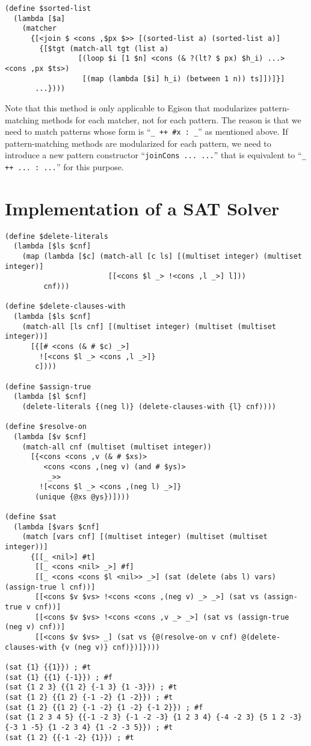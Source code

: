\documentclass{article}
\begin{document}
\begin{lstlisting}[language=egison]
(define $sorted-list
  (lambda [$a]
    (matcher
      {[<join $ <cons ,$px $>> [(sorted-list a) (sorted-list a)]
        {[$tgt (match-all tgt (list a)
                 [(loop $i [1 $n] <cons (& ?(lt? $ px) $h_i) ...> <cons ,px $ts>)
                  [(map (lambda [$i] h_i) (between 1 n)) ts]])]}]
       ...})))
\end{lstlisting}

Note that this method is only applicable to Egison that modularizes pattern-matching methods for each matcher, not for each pattern.
The reason is that we need to match patterns whose form is ``\verb|_ ++ #x : _|'' as mentioned above.
If pattern-matching methods are modularized for each pattern, we need to introduce a new pattern constructor ``\verb|joinCons ... ...|'' that is equivalent to ``\verb|_ ++ ... : ...|'' for this purpose.

\section{Implementation of a SAT Solver}\label{sat-program}

\begin{lstlisting}[language=egison]
(define $delete-literals
  (lambda [$ls $cnf]
    (map (lambda [$c] (match-all [c ls] [(multiset integer) (multiset integer)]
                        [[<cons $l _> !<cons ,l _>] l]))
         cnf)))

(define $delete-clauses-with
  (lambda [$ls $cnf]
    (match-all [ls cnf] [(multiset integer) (multiset (multiset integer))]
      [{[# <cons (& # $c) _>]
        ![<cons $l _> <cons ,l _>]}
       c])))

(define $assign-true
  (lambda [$l $cnf]
    (delete-literals {(neg l)} (delete-clauses-with {l} cnf))))

(define $resolve-on
  (lambda [$v $cnf]
    (match-all cnf (multiset (multiset integer))
      [{<cons <cons ,v (& # $xs)>
         <cons <cons ,(neg v) (and # $ys)>
          _>>
        ![<cons $l _> <cons ,(neg l) _>]}
       (unique {@xs @ys})])))

(define $sat
  (lambda [$vars $cnf]
    (match [vars cnf] [(multiset integer) (multiset (multiset integer))]
      {[[_ <nil>] #t]
       [[_ <cons <nil> _>] #f]
       [[_ <cons <cons $l <nil>> _>] (sat (delete (abs l) vars) (assign-true l cnf))]
       [[<cons $v $vs> !<cons <cons ,(neg v) _> _>] (sat vs (assign-true v cnf))]
       [[<cons $v $vs> !<cons <cons ,v _> _>] (sat vs (assign-true (neg v) cnf))]
       [[<cons $v $vs> _] (sat vs {@(resolve-on v cnf) @(delete-clauses-with {v (neg v)} cnf)})]})))

(sat {1} {{1}}) ; #t
(sat {1} {{1} {-1}}) ; #f
(sat {1 2 3} {{1 2} {-1 3} {1 -3}}) ; #t
(sat {1 2} {{1 2} {-1 -2} {1 -2}}) ; #t
(sat {1 2} {{1 2} {-1 -2} {1 -2} {-1 2}}) ; #f
(sat {1 2 3 4 5} {{-1 -2 3} {-1 -2 -3} {1 2 3 4} {-4 -2 3} {5 1 2 -3} {-3 1 -5} {1 -2 3 4} {1 -2 -3 5}}) ; #t
(sat {1 2} {{-1 -2} {1}}) ; #t
\end{lstlisting}
\end{document}

